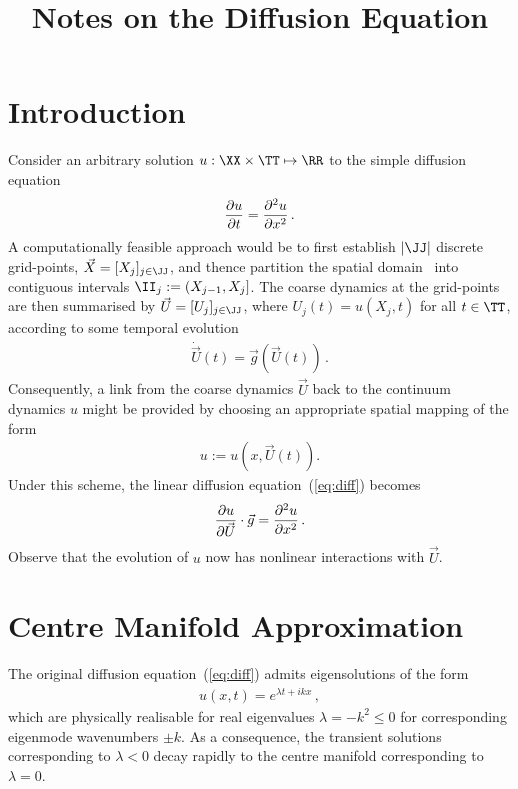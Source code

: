 \documentclass[12pt,a5paper]{article}
\title{Notes on the Diffusion Equation}
\begin{document}
\maketitle
\section{Introduction}
Consider an arbitrary solution $u:\XX\times \TT\mapsto \RR$ to the simple diffusion equation 
\begin{eqnarray}
	\D tu = \DD xu\,.
	\label{eq:diff}
\end{eqnarray}
A computationally feasible approach would be to 
first establish $|{\JJ}|$ discrete grid-points,
${\vec X}=[X_j]_{j\in\JJ}$, and thence
partition the spatial domain \XX\ into 
contiguous intervals \(\II_j:=(X_{j-1},X_j]\). 
The coarse dynamics at the grid-points are then summarised by
${\vec U}=[U_j]_{j\in\JJ}$, where $U_j(t)=u(X_j,t)$ for all $t\in \TT$, according to some temporal evolution
\begin{eqnarray}
	\dot{\vec U}(t) = {\vec g}({\vec U}(t))\,.
	\label{eq:temporal}
\end{eqnarray}
Consequently, a link from the coarse dynamics ${\vec U}$ back to the continuum dynamics $u$ might be provided
by choosing an appropriate spatial mapping of the form
\begin{eqnarray}
	u  := u(x,{\vec U}(t)).
	\label{eq:spatial}
\end{eqnarray}
Under this scheme, the linear diffusion equation~(\ref{eq:diff}) becomes
\begin{eqnarray}
	\D {\vec U}{u}\cdot{\vec g} = \DD x{u}\,.
	\label{eq:diff2}
\end{eqnarray}
Observe that the evolution of $u$ now has nonlinear interactions with ${\vec U}$.

\section{Centre Manifold Approximation}\label{sec:centre-man}
The original diffusion equation~(\ref{eq:diff}) admits 
eigensolutions of the form
\begin{eqnarray}
	u(x,t)  = e^{\lambda t+ikx}\,,
\label{eq:raw-eigmode}
\end{eqnarray}
which are physically realisable for real eigenvalues $\lambda=-k^2\le 0$ for 
corresponding eigenmode wavenumbers $\pm k$. 
As a consequence, the transient solutions corresponding
to $\lambda<0$ decay rapidly to the centre manifold corresponding to $\lambda=0$. 
\end{document}
